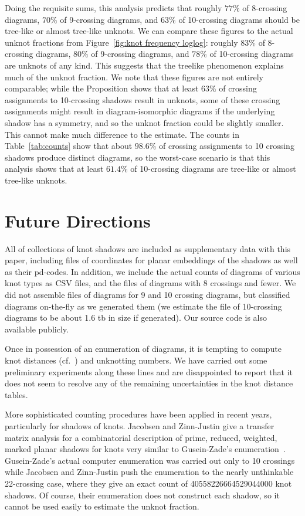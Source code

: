 \documentclass[amsmath,secnumarabic,floatfix,amssymb,nofootinbib,nobibnotes,letterpaper,11pt,tightenlines,showkeys]{revtex4}
\theoremstyle{definition}
\begin{document}
Doing the requisite sums, this analysis predicts that roughly $77\%$ of 8-crossing diagrams, $70\%$ of 9-crossing diagrams, and $63\%$ of 10-crossing diagrams should be tree-like or almost tree-like unknots. We can compare these figures to the actual unknot fractions from Figure~\ref{fig:knot frequency loglog}: roughly $83\%$ of 8-crossing diagrams, $80\%$ of 9-crossing diagrams, and $78\%$ of 10-crossing diagrams are unknots of any kind. This suggests that the treelike phenomenon explains much of the unknot fraction. We note that these figures are not entirely comparable; while the Proposition shows that at least $63\%$ of crossing assignments to 10-crossing shadows result in unknots, some of these crossing assignments might result in diagram-isomorphic diagrams if the underlying shadow has a symmetry, and so the unknot fraction could be slightly smaller. This cannot make much difference to the estimate. The counts in Table~\ref{tab:counts} show that about $98.6\%$ of crossing assignments to 10 crossing shadows produce distinct diagrams, so the worst-case scenario is that this analysis shows that at least $61.4\%$ of 10-crossing diagrams are tree-like or almost tree-like unknots.

\section{Future Directions}

All of collections of knot shadows are included as supplementary data with this paper, including files of coordinates for planar embeddings of the shadows as well as their pd-codes. In addition, we include the actual counts of diagrams of various knot types as CSV files, and the files of diagrams with 8 crossings and fewer. We did not assemble files of diagrams for 9 and 10 crossing diagrams, but classified diagrams on-the-fly as we generated them (we estimate the file of 10-crossing diagrams to be about 1.6 tb in size if generated). Our source code is also available publicly.

Once in possession of an enumeration of diagrams, it is tempting to compute knot distances (cf.~\cite{DARCY:2001fi,MoonHyeyoung:2010tm}) and unknotting numbers. We have carried out some preliminary experiments along these lines and are disappointed to report that it does not seem to resolve any of the remaining uncertainties in the knot distance tables.

More sophisticated counting procedures have been applied in recent years, particularly for shadows of knots. Jacobsen and Zinn-Justin\cite{Jacobsen:2002kia} give a transfer matrix analysis for a combinatorial description of prime, reduced, weighted, marked planar shadows for knots very similar to Gusein-Zade's enumeration~\cite{GusenZade:1994wl,GusenZade:1998jz}. Gusein-Zade's actual computer enumeration was carried out only to 10 crossings while Jacobsen and Zinn-Justin push the enumeration to the nearly unthinkable 22-crossing case, where they give an exact count of 40558226664529044000 knot shadows. Of course, their enumeration does not construct each shadow, so it cannot be used easily to estimate the unknot fraction.
\end{document}
